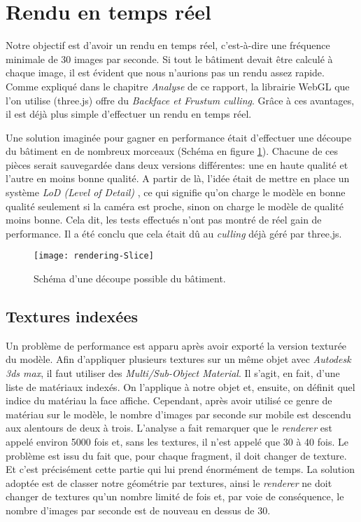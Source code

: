 \section{Rendu en temps réel}

Notre objectif est d'avoir un rendu en temps réel, c'est-à-dire une fréquence minimale de 30 images par seconde. Si tout le bâtiment devait être calculé à chaque image, il est évident que nous n'aurions pas un rendu assez rapide. Comme expliqué dans le chapitre \emph{Analyse} de ce rapport, la librairie WebGL que l'on utilise (three.js) offre du \textit{Backface et Frustum culling}. Grâce à ces avantages, il est déjà plus simple d'effectuer un rendu en temps réel.

Une solution imaginée pour gagner en performance était d'effectuer une découpe du bâtiment en de nombreux morceaux (Schéma en figure \ref{fig:rendering-slice}). Chacune de ces pièces serait sauvegardée dans deux versions différentes: une en haute qualité et l'autre en moins bonne qualité. A partir de là, l'idée était de mettre en place un système \emph{LoD (Level of Detail)} \cite{wiki-lod}, ce qui signifie qu'on charge le modèle en bonne qualité seulement si la caméra est proche, sinon on charge le modèle de qualité moins bonne. Cela dit, les tests effectués n'ont pas montré de réel gain de performance. Il a été conclu que cela était dû au \textit{culling} déjà géré par three.js.

\begin{figure}
\centering
\texttt{[image: rendering-Slice]}
\caption{Schéma d'une découpe possible du bâtiment.}
\label{fig:rendering-slice}
\end{figure}

\subsection{Textures indexées}
Un problème de performance est apparu après avoir exporté la version texturée du modèle. Afin d'appliquer plusieurs textures sur un même objet avec \textit{Autodesk 3ds max}, il faut utiliser des \emph{Multi/Sub-Object Material}. Il s'agit, en fait, d'une liste de matériaux indexés. On l'applique à notre objet et, ensuite, on définit quel indice du matériau la face affiche. Cependant, après avoir utilisé ce genre de matériau sur le modèle, le nombre d'images par seconde sur mobile est descendu aux alentours de deux à trois. L'analyse a fait remarquer que le \textit{renderer} est appelé environ 5000 fois et, sans les textures, il n'est appelé que 30 à 40 fois. Le problème est issu du fait que, pour chaque fragment, il doit changer de texture. Et c'est précisément cette partie qui lui prend énormément de temps. La solution adoptée est de classer notre géométrie par textures, ainsi le \textit{renderer} ne doit changer de textures qu'un nombre limité de fois et, par voie de conséquence, le nombre d'images par seconde est de nouveau en dessus de 30.


